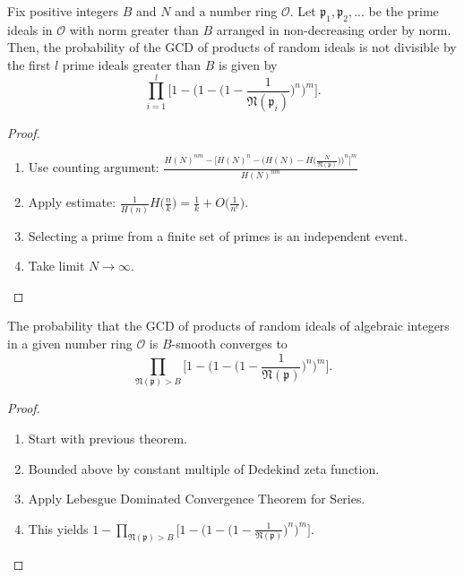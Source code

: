 \documentclass[11pt,xcolor={dvipsnames}]{beamer}
\newcommand{\f}[1]{\mathfrak{#1}}
\begin{document}
	\begin{frame}
	\begin{theorem}
		Fix positive integers $B$ and $N$ and a number ring $\mathcal{O}$. Let $\mathfrak{p}_1, \mathfrak{p}_2, ...$ be the prime ideals in $\mathcal{O}$ with norm greater than $B$ arranged in non-decreasing order by norm. Then, the probability of the GCD of products of random ideals is not divisible by the first $l$ prime ideals greater than $B$ is given by 
		$$\prod_{i=1}^{l} \Big[1 - \Big(1 - \Big(1-\frac{1}{\mathfrak{N}(\mathfrak{p}_i)}\Big)^n\Big)^m\Big].$$
	\end{theorem}
	
	\begin{proof}
		\begin{enumerate}
			\item Use counting argument: $\frac{H(N)^{nm}-\Big[H(N)^n - \Big(H(N) - H\Big(\frac{N}{\f{N(p)}}\Big)\Big)^n\Big]^m}{H(N)^{nm}}$
			\item Apply estimate: $\frac{1}{H(n)} H\Big(\frac{n}{k}\Big) = \frac{1}{k} + O\Big(\frac{1}{n^{\epsilon}}\Big).$
			\item Selecting a prime from a finite set of primes is an independent event.
			\item Take limit $N \to \infty$.
		\end{enumerate}
	\end{proof}
\end{frame}

\begin{frame}
	\begin{theorem}
		The probability that the GCD of products of random ideals of algebraic integers in a given number ring $\mathcal{O}$ is $B$-smooth converges to
		$$\prod_{\f{N}(\f{p})>B}\Big[1 - \Big(1 - \Big(1 - \frac{1}{\f{N}(\f{p})}\Big)^n \Big)^m \Big].$$
	\end{theorem}
	\begin{proof}
		\begin{enumerate}
			\item Start with previous theorem.
                \item Bounded above by constant multiple of Dedekind zeta function.
			\item Apply Lebesgue Dominated Convergence Theorem for Series.
				\item This yields $1 - \prod_{\mathfrak{N}(\mathfrak{p}) > B} \Big[1 - \Big(1 - \Big(1 - \frac{1}{\mathfrak{N}(\mathfrak{p})}  \Big)^n\Big)^m\Big].$
		\end{enumerate}
	\end{proof}
\end{frame}
\end{document}
